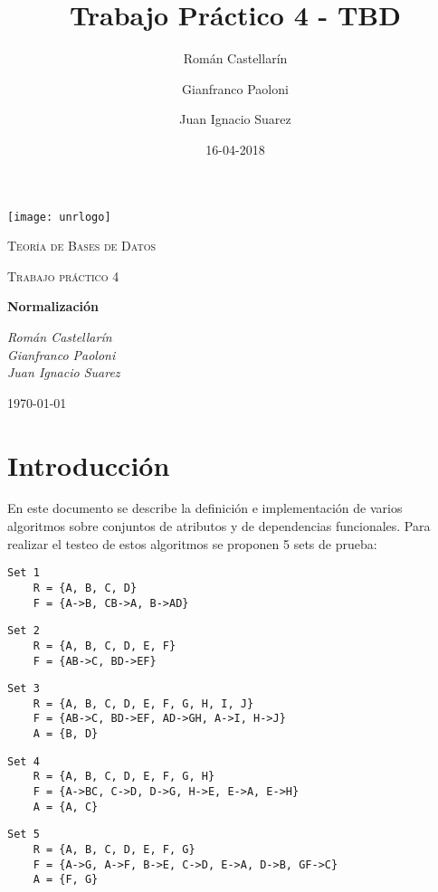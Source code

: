 \documentclass{article}
\title{Trabajo Práctico 4 - TBD}
\date{16-04-2018}
\author{
	Román Castellarín\\
	\and
	Gianfranco Paoloni\\
	\and
	Juan Ignacio Suarez
}
\begin{document}
\begin{titlepage}
	\centering
	\texttt{[image: unrlogo]}\par\vspace{1cm}
	{\scshape\LARGE Teoría de Bases de Datos \par}
	{\scshape\Large Trabajo práctico 4\par}
	\vspace{1.5cm}
	{\huge\bfseries Normalización \par}
	\vspace{2cm}
	{\Large\itshape  Román Castellarín \\
	                 Gianfranco Paoloni \\
	                 Juan Ignacio Suarez \par}
	\vfill

	{\large \today \par}
\end{titlepage}

\tableofcontents

\newpage
\section{Introducción}
En este documento se describe la definición e implementación de varios algoritmos sobre conjuntos de atributos y de dependencias funcionales. Para realizar el testeo de estos algoritmos se proponen 5 sets de prueba:

\begin{Verbatim}[frame=single]
    Set 1
    R = {A, B, C, D}
    F = {A->B, CB->A, B->AD}
\end{Verbatim}

\begin{Verbatim}[frame=single]
    Set 2
    R = {A, B, C, D, E, F}
    F = {AB->C, BD->EF}
\end{Verbatim}

\begin{Verbatim}[frame=single]
    Set 3
    R = {A, B, C, D, E, F, G, H, I, J}
    F = {AB->C, BD->EF, AD->GH, A->I, H->J}
    A = {B, D}
\end{Verbatim}

\begin{Verbatim}[frame=single]
    Set 4
    R = {A, B, C, D, E, F, G, H}
    F = {A->BC, C->D, D->G, H->E, E->A, E->H}
    A = {A, C}
\end{Verbatim}

\begin{Verbatim}[frame=single]
    Set 5
    R = {A, B, C, D, E, F, G}
    F = {A->G, A->F, B->E, C->D, E->A, D->B, GF->C}
    A = {F, G}
\end{Verbatim}
\end{document}

